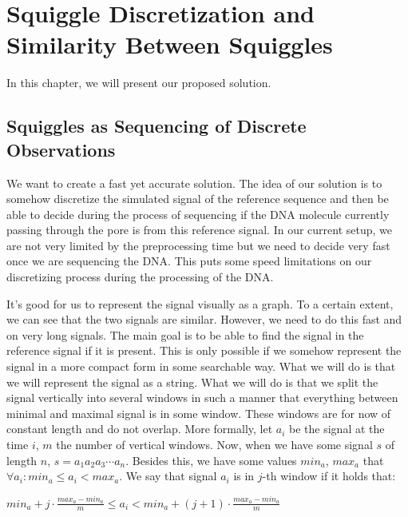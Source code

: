 \chapter{Squiggle Discretization and Similarity Between Squiggles}

\label{kap:proposedMethod} %

In this chapter, we will present our proposed solution.

\section{Squiggles as Sequencing of Discrete Observations}

We want to create a fast yet accurate solution. The idea of our solution is to somehow
discretize the simulated signal of the reference sequence and then be able to decide
during the process of sequencing if the DNA molecule currently passing through the
pore is from this reference signal. In our current setup, we are not very limited
by the preprocessing time but we need to decide very fast once we are sequencing
the DNA. This puts some speed limitations on our discretizing process during the
processing of the DNA.

It's good for us to represent the signal visually as a graph. To a certain extent, we
can see that the two signals are similar. However, we need to do this fast and on very
long signals. The main goal is to be able to find the signal in the reference
signal if it is present. This is only possible if we somehow represent the signal
in a more compact form in some searchable way. What we will do is that we will
represent the signal as a string. What we will do is that we split the signal vertically
into several windows in such a manner that everything between minimal and maximal
signal is in some window. These windows are for now of constant length and do not
overlap. More formally, let $a_i$ be the signal at the time $i$, $m$ the number of
vertical windows. Now, when we have some signal $s$ of length $n$, $s=a_1a_2a_3\cdots a_n$.
Besides this, we have some values $min_a$, $max_a$ that $\forall a_i: min_a \leq a_i < max_a$. We say that signal $a_i$ is in $j$-th
window if it holds that:

\begin{center}
$min_a + j\cdot \frac{max_a-min_a}{m} \leq a_i < min_a + (j+1)\cdot \frac{max_a-min_a}{m}$
\end{center}


